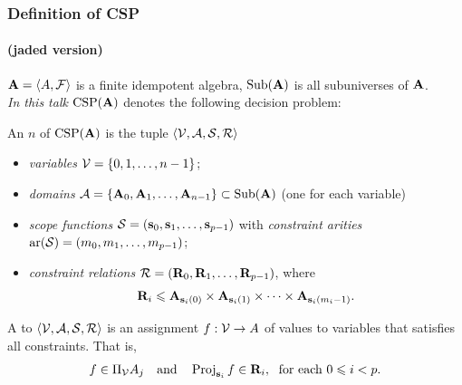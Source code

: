 \documentclass[9pt,xcolor=dvipsnames%
   ]{beamer}
\renewcommand{\alert}[1]{\textcolor{olivegreen}{#1}}
\renewcommand{\emph}[1]{\alert{{\it #1}}}
\begin{document}
\begin{frame}
  \frametitle{Definition of CSP}
  \framesubtitle{(jaded version)}

  $\mathbf{A} = \langle A, \mathcal{F}\rangle$ is a finite idempotent algebra,
  $\mbox{Sub}(\mathbf{A})$ is all subuniverses of $\mathbf{A}$. \\[4pt]

  {\it In this talk} $\operatorname{CSP}(\mathbf{A})$ denotes the following decision problem:

  \bigskip
  
  An  $n$ of $\operatorname{CSP}(\mathbf{A})$ is the tuple $\langle\mathcal{V}, \mathcal{A}, \mathcal{S}, \mathcal{R}\rangle$ 
  \begin{itemize}
  \item \emph{variables} $\mathcal{V} = \{0, 1, \dots, n-1\}$;\\[4pt]
  \item \emph{domains} $\mathcal{A} = \{\mathbf{A}_0, \mathbf{A}_1, \dots, \mathbf{A}_{n-1}\} \subset \mbox{Sub}(\mathbf{A})$  (one for each variable)\\[4pt]
  \item \emph{scope functions} $\mathcal{S} = (\mathbf{s}_0, \mathbf{s}_1, \dots, \mathbf{s}_{p-1})$ 
    with \emph{constraint arities} $\operatorname{ar}(\mathcal{S}) = (m_0, m_1, \dots, m_{p-1})$;\\[4pt]
  \item \emph{constraint relations} $\mathcal{R} = (\mathbf{R}_0, \mathbf{R}_1, \dots, \mathbf{R}_{p-1})$, where
    \[\mathbf{R}_i \leqslant \mathbf{A}_{\mathbf{s}_i(0)} \times \mathbf{A}_{\mathbf{s}_i(1)}\times \cdots \times \mathbf{A}_{\mathbf{s}_i(m_i-1)}.\]
  \end{itemize}
  
  \bigskip
  
  A  to $\langle\mathcal{V}, \mathcal{A}, \mathcal{S}, \mathcal{R}\rangle$ is an assignment
  $f: \mathcal{V} \to A$ of values to variables that satisfies all constraints. That is,
  \[f\in \Pi_{\mathcal{V}}A_j
  \quad  \text{and} \quad 
  \operatorname{Proj}_{\mathbf{s}_i} f \in \mathbf{R}_i, \;\text{ for each $0\leqslant i < p$.}\]

\end{frame}
\end{document}
